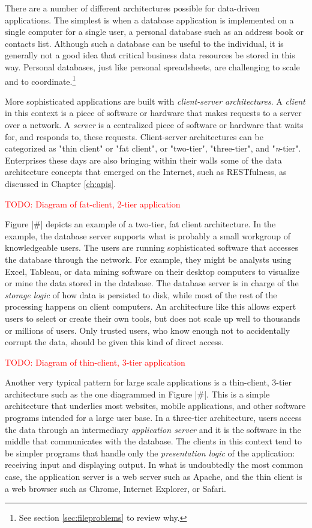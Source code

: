 \documentclass[11pt]{book}
\newcommand{\term}[1]{\emph{#1}} %
\newcommand{\todo}[1]{\textcolor{red}{TODO: #1}} %
\begin{document}
There are a number of different architectures possible for data-driven applications.  The simplest is when a database application is implemented on a single computer for a single user, a personal database such as an address book or contacts list.  Although such a database can be useful to the individual, it is generally not a good idea that critical business data resources be stored in this way.  Personal databases, just like personal spreadsheets, are challenging to scale and to coordinate.\footnote{See section \ref{sec:fileproblems} to review why.} 

More sophisticated applications are built with \term{client-server architectures}.  A \term{client} in this context is a piece of software or hardware that makes requests to a server over a network.  A \term{server} is a centralized piece of software or hardware that waits for, and responds to, these requests.  Client-server architectures can be categorized as "thin client" or "fat client", or "two-tier", "three-tier", and "\emph{n}-tier".  Enterprises these days are also bringing within their walls some of the data architecture concepts that emerged on the Internet, such as RESTfulness, as discussed in Chapter \ref{ch:apis}.

\todo{Diagram of fat-client, 2-tier application}

Figure |#| depicts an example of a two-tier, fat client architecture.  In the example, the database server supports what is probably a small workgroup of knowledgeable users.  The users are running sophisticated software that accesses the database through the network.  For example, they might be analysts using Excel, Tableau, or data mining software on their desktop computers to visualize or mine the data stored in the database.  The database server is in charge of the \term{storage logic} of how data is persisted to disk, while most of the rest of the processing happens on client computers.  An architecture like this allows expert users to select or create their own tools, but does not scale up well to thousands or millions of users.  Only trusted users, who know enough not to accidentally corrupt the data, should be given this kind of direct access.

\todo{Diagram of thin-client, 3-tier application}

Another very typical pattern for large scale applications is a thin-client, 3-tier architecture such as the one diagrammed in Figure |#|.  This is a simple architecture that underlies most websites, mobile applications, and other software programs intended for a large user base.  In a three-tier architecture, users access the data through an intermediary \term{application server} and it is the software in the middle that communicates with the database.  The clients in this context tend to be simpler programs that handle only the \term{presentation logic} of the application: receiving input and displaying output.  In what is undoubtedly the most common case, the application server is a web server such as Apache, and the thin client is a web browser such as Chrome, Internet Explorer, or Safari.
\end{document}
